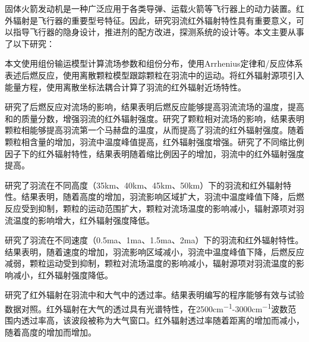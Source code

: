 \begin{zhabstract}

固体火箭发动机是一种广泛应用于各类导弹、运载火箭等飞行器上的动力装置。红外辐射是飞行器的重要型号特征。因此，研究羽流红外辐射特性具有重要意义，可以指导飞行器的隐身设计，推进剂的配方改进，探测系统的设计等。本文主要从事了以下研究：

本文使用组份输运模型计算流场参数和组份分布，使用Arrhenius定律和/反应体系表述后燃反应，使用离散颗粒模型跟踪颗粒在羽流中的运动。将红外辐射源项引入能量方程，使用离散坐标法耦合计算了羽流的红外辐射近场特性。

研究了后燃反应对流场的影响，结果表明后燃反应能够提高羽流流场的温度，提高和的质量分数，增强羽流的红外辐射强度。研究了颗粒相对流场的影响，结果表明颗粒相能够提高羽流第一个马赫盘的温度，从而提高了羽流的红外辐射强度。随着颗粒相含量的增加，羽流中温度峰值提高，红外辐射强度增强。研究了不同缩比例因子下的红外辐射特性，结果表明随着缩比例因子的增加，羽流中的红外辐射强度提高。

研究了羽流在不同高度（35km、40km、45km、50km）下的羽流和红外辐射特性。结果表明，随着高度的增加，羽流影响区域扩大，羽流中温度峰值下降，后燃反应受到抑制，颗粒的运动范围扩大，颗粒对流场温度的影响减小，辐射源项对羽流温度的影响增大，红外辐射强度降低。

研究了羽流在不同速度（0.5ma、1ma、1.5ma、2ma）下的羽流和红外辐射特性。结果表明，随着速度的增加，羽流影响区域减小，羽流中温度峰值下降，后燃反应减弱，颗粒运动受到抑制，颗粒对流场温度的影响减小，辐射源项对羽流温度的影响减小，红外辐射强度降低。

研究了红外辐射在羽流中和大气中的透过率。结果表明编写的程序能够有效与试验数据对照。红外辐射在大气的透过具有光谱特性，在2500\si{cm^{-1}}-3000\si{cm^{-1}}波数范围内透过率高，该波段被称为大气窗口。红外辐射透过率随着距离的增加而减小，随着高度的增加而增加。

 
\end{zhabstract}


